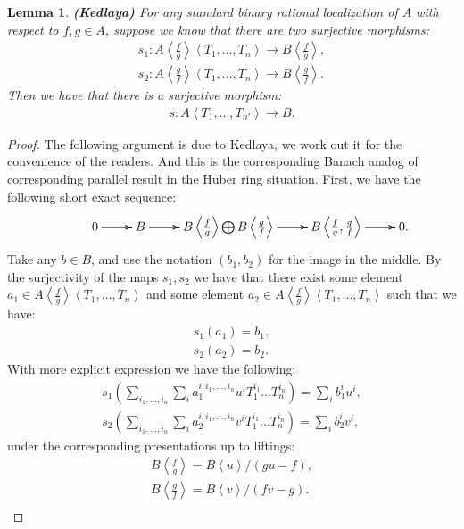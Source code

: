 \documentclass[12pt]{amsart}
\newtheorem{lemma}[theorem]{Lemma}
\theoremstyle{definition}
\numberwithin{equation}{section}
\begin{document}
\begin{lemma}\mbox{\bf{(Kedlaya)}} \label{lemma2.5}
For any standard binary rational localization of $A$ with respect to $f,g\in A$, suppose we know that there are two surjective morphisms:
\begin{align}
s_1:A\left<\frac{f}{g}\right>\left<T_1,...,T_n\right>\rightarrow B\left<\frac{f}{g}\right>,\\
s_2:A\left<\frac{g}{f}\right>\left<T_1,...,T_{n}\right>\rightarrow B\left<\frac{g}{f}\right>.	
\end{align}
Then we have that there is a surjective morphism:
\begin{align}
s:A\left<T_1,...,T_{n'}\right>\rightarrow B.
\end{align}	
\end{lemma}

\begin{proof}
The following argument is due to Kedlaya, we work out it for the convenience of the readers. And this is the corresponding Banach analog of corresponding parallel result in the Huber ring situation. First, we have the following short exact sequence:
\[
\xymatrix@C+0pc@R+0pc{
&0 \ar[r] \ar[r] \ar[r] &B \ar[r] \ar[r] \ar[r] &B\left<\frac{f}{g}\right>\bigoplus B\left<\frac{g}{f}\right> \ar[r] \ar[r] \ar[r] &B\left<\frac{f}{g},\frac{g}{f}\right> \ar[r] \ar[r] \ar[r] &0.
}
\]
Take any $b\in B$, and use the notation $(b_1,b_2)$ for the image in the middle. By the surjectivity of the maps $s_1,s_2$ we have that there exist some element $a_1\in A\left<\frac{f}{g}\right>\left<T_1,...,T_n\right>$ and some element $a_2\in A\left<\frac{f}{g}\right>\left<T_1,...,T_n\right>$ such that we have:
\begin{align}
s_1(a_1)=b_1,\\
s_2(a_2)=b_2.	
\end{align}
With more explicit expression we have the following:
\begin{align}
s_1(\sum_{i_1,...,i_n}\sum_{i} a_1^{i,i_1,...,i_n}u^iT_1^{i_1}...T_n^{i_n})=\sum_i b_1^iu^i,\\
s_2(\sum_{i_1,...,i_n}\sum_{i} a_2^{i,i_1,...,i_n}v^iT_1^{i_1}...T_n^{i_n})=\sum_i b_2^iv^i,	
\end{align}	
under the corresponding presentations up to liftings:
\begin{align}
B\left<\frac{f}{g}\right>=B\left<u\right>/(gu-f),\\
B\left<\frac{g}{f}\right>=B\left<v\right>/(fv-g).\\	
\end{align}

\end{proof}
\end{document}
